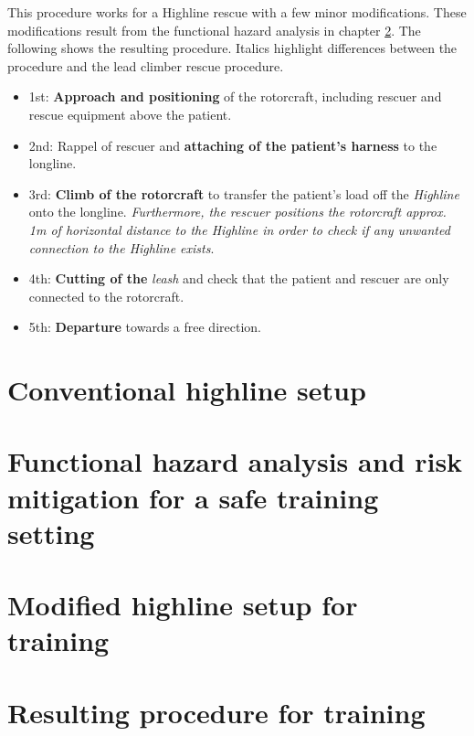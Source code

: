 \documentclass[a4paper,10pt]{scrartcl}
\begin{document}
This procedure works for a Highline rescue with a few minor modifications. These modifications result from the functional hazard analysis in chapter \ref{sec:fha}. The following shows the resulting procedure. Italics highlight differences between the procedure and the lead climber rescue procedure. 

\begin{itemize}
\item  1st: \textbf{Approach and positioning} of the rotorcraft, including rescuer and rescue equipment above the patient.
\item  2nd: Rappel of rescuer and \textbf{attaching of the patient's harness} to the longline.
\item 3rd: \textbf{Climb of the rotorcraft} to transfer the patient's load off the \textit{Highline} onto the longline. \textit{Furthermore, the rescuer positions the rotorcraft approx. 1m of horizontal distance to the Highline in order to check if any unwanted connection to the Highline exists}.
\item 4th: \textbf{Cutting of the} \textit{leash} and check that the patient and rescuer are only connected to the rotorcraft.
\item 5th: \textbf{Departure} towards a free direction.
\end{itemize}

\section{Conventional highline setup}
\label{sec:conventional}

\section{Functional hazard analysis and risk mitigation for a safe training setting}
\label{sec:fha}

\section{Modified highline setup for training}
\label{sec:modified}

\section{Resulting procedure for training}
\label{sec:result}
\end{document}
